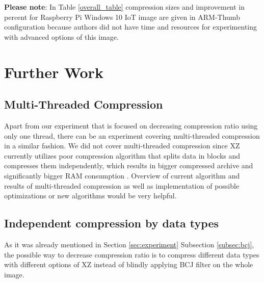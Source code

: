 \documentclass[conference]{IEEEtran}
\begin{document}
\textbf{Please note}: In Table \ref{overall_table} compression sizes and improvement in percent for Raspberry Pi Windows 10 IoT image  are given in ARM-Thumb configuration because authors did not have time and resources for experimenting with advanced options of this image.
    
\section{Further Work}

\subsection{Multi-Threaded Compression}
Apart from our experiment that is focused on decreasing compression ratio using only one thread, there can be an experiment covering multi-threaded compression in a similar fashion. We did not cover multi-threaded compression since XZ currently utilizes poor compression algorithm that splits data in blocks and compresses them independently, which results in bigger compressed archive and significantly bigger RAM consumption \cite{link:xz-mt}. Overview of current algorithm and results of multi-threaded compression as well as implementation of possible optimizations or new algorithms would be very helpful.
% 
% 

\subsection{Independent compression by data types}
As it was already mentioned in Section \ref{sec:experiment} Subsection \ref{subsec:bcj}, the possible way to decrease compression ratio is to compress different data types with different options of XZ instead of blindly applying BCJ filter on the whole image.
% 
\end{document}
